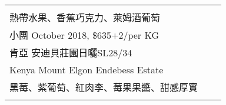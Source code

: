 \documentclass[10pt,a4paper]{article}
\begin{document}
\begin{tabular}{C{0.3090\textwidth} C{0.3075\textwidth} C{0.3065\textwidth}}
{ \vspace*{-0.22em} \\ %
\footnotesize 熱帶水果、香蕉巧克力、萊姆酒葡萄%
\vspace*{0.345em}\\%
小團 October  2018,  \$635+2/per KG \vspace*{-0.2em} \\ %
肯亞 安迪貝莊園日曬SL28/34 \vspace*{-0.12em} \\ Kenya Mount Elgon Endebess Estate%
 \vspace*{-0.22em} \\ %
\footnotesize 黑莓、紫葡萄、紅肉李、莓果果醬、甜感厚實%
%
}& 
\end{tabular}
\end{document}
